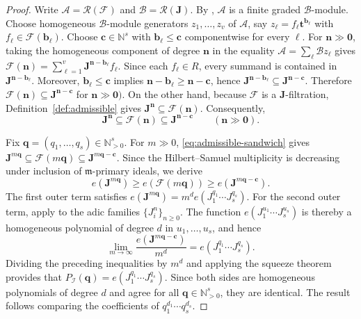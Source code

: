 \documentclass[reqno,12pt]{amsart}
\theoremstyle{plain}
\theoremstyle{definition}
\theoremstyle{remark}
\newcommand{\N}{\mathbb N}
\numberwithin{equation}{section}
\begin{document}
\begin{proof}
Write $\mathcal A=\mathcal R(\mathcal F)$ and
$\mathcal B=\mathcal R(\mathbf J)$. By
\cite[Proposition~2.5]{MasutiSarkarVerma}, $\mathcal A$ is a finite
graded $\mathcal B$-module. Choose homogeneous $\mathcal B$-module
generators
$z_1,\ldots,z_v$ of $\mathcal A$, say
$z_\ell=f_\ell\mathbf t^{\mathbf b_\ell}$ with
$f_\ell\in\mathcal F(\mathbf b_\ell)$. Choose
$\mathbf c\in\N^s$ with $\mathbf b_\ell\leq\mathbf c$ componentwise
for every $\ell$. For $\mathbf n\gg\mathbf0$, taking the homogeneous component of degree
$\mathbf n$ in the equality
$\mathcal A=\sum_\ell\mathcal Bz_\ell$ gives $\mathcal F(\mathbf n)
=
\sum_{\ell=1}^{v}
\mathbf J^{\mathbf n-\mathbf b_\ell}f_\ell.$
Since each $f_\ell\in R$, every summand is contained in
$\mathbf J^{\mathbf n-\mathbf b_\ell}$. Moreover,
$\mathbf b_\ell\leq\mathbf c$ implies
$\mathbf n-\mathbf b_\ell\geq\mathbf n-\mathbf c$, hence
$\mathbf J^{\mathbf n-\mathbf b_\ell}
\subseteq\mathbf J^{\mathbf n-\mathbf c}$. Therefore $\mathcal F(\mathbf n)\subseteq\mathbf J^{\mathbf n-\mathbf c}$
 for $\mathbf n\gg\mathbf0).$
On the other hand, because $\mathcal F$ is a $\mathbf J$-filtration,
Definition~\ref{def:admissible} gives
$\mathbf J^{\mathbf n}\subseteq\mathcal F(\mathbf n)$. Consequently,
\begin{equation}
\label{eq:admissible-sandwich}
\mathbf J^{\mathbf n}
\subseteq\mathcal F(\mathbf n)
\subseteq\mathbf J^{\mathbf n-\mathbf c}
\qquad(\mathbf n\gg\mathbf0).
\end{equation}

Fix $\mathbf q=(q_1,\ldots,q_s)\in\N_{>0}^s$. For $m\gg0$,
\eqref{eq:admissible-sandwich} gives $\mathbf J^{m\mathbf q}
\subseteq\mathcal F(m\mathbf q)
\subseteq\mathbf J^{m\mathbf q-\mathbf c}.$
Since the Hilbert--Samuel multiplicity is decreasing under inclusion of
$\mathfrak m$-primary ideals, we derive
\[
e(\mathbf J^{m\mathbf q})
\geq e(\mathcal F(m\mathbf q))
\geq e(\mathbf J^{m\mathbf q-\mathbf c}).
\]
The first outer term satisfies
$e(\mathbf J^{m\mathbf q})=m^d e(J_1^{q_1}\cdots J_s^{q_s})$.
For the second outer term, apply
\cite[Theorem~1.6]{Cutkosky2026} to the adic families
$\{J_i^n\}_{n\geq0}$. The function
$e(J_1^{u_1}\cdots J_s^{u_s})$ is thereby a homogeneous polynomial of
degree $d$ in $u_1,\ldots,u_s$, and hence
\[
\lim_{m\to\infty}
\frac{e(\mathbf J^{m\mathbf q-\mathbf c})}{m^d}
=
e(J_1^{q_1}\cdots J_s^{q_s}).
\]
Dividing the preceding inequalities by $m^d$ and applying the squeeze
theorem provides that $P_{\boldsymbol{\mathcal I}}(\mathbf q)
=
e(J_1^{q_1}\cdots J_s^{q_s}).$
Since both sides are homogeneous polynomials of degree $d$ and agree for
all $\mathbf q\in\mathbb N_{>0}^s$, they are identical. The result follows comparing the
coefficients of $q_1^{d_1}\cdots q_s^{d_s}$.
\end{proof}
\end{document}
